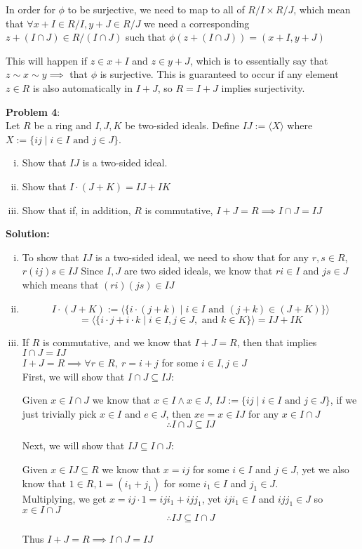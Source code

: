 \documentclass[11pt]{article}
\newcommand{\prob}[3]{\begin{flushleft}
        \textbf{Problem #1}: \\
        #2 
		\textbf{Solution:} 
		#3

\end{flushleft}}
\begin{document}
{    In order for $\phi$ to be surjective, we need to map to all of $R/I \times R/J$, which mean that $\forall x + I \in R/I, y + J \in R/J$ we need a corresponding $z + (I \cap J) \in R/(I \cap J)$ such that $\phi(z + (I \cap J)) = (x + I, y + J)$

    This will happen if $z \in x + I$ and $z \in y + J$, which is to essentially say that $z \sim x \sim y \implies$ that $\phi$ is surjective.
    This is guaranteed to occur if any element $z \in R$ is also automatically in $I + J$, so $R = I + J$ implies surjectivity.
}

\prob{4}{
    Let $R$ be a ring and $I,J,K$ be two-sided ideals. Define $IJ := \langle X \rangle$ where $X := \{ ij \mid i \in I \text{ and } j \in J \}$.
    \begin{enumerate}[(i)]
        \item Show that $IJ$ is a two-sided ideal.
        \item Show that $I \cdot (J + K) = IJ + IK$
        \item Show that if, in addition, $R$ is commutative, $I + J = R \implies I \cap J = IJ$
    \end{enumerate}
}{
    \begin{enumerate}[(i)]
        \item To show that $IJ$ is a two-sided ideal, we need to show that for any $r, s \in R$, $r(ij)s \in IJ$
              Since $I,J$ are two sided ideals, we know that $ri \in I$ and $js \in J$ which means that $(ri)(js) \in IJ$

        \item $$I \cdot (J + K) := \langle \{ i \cdot (j + k) \mid i \in I \text{ and } (j + k) \in (J + K) \} \rangle$$
              $$= \langle \{ i \cdot j + i \cdot k \mid i \in I, j \in J, \text{ and } k \in K \} \rangle = IJ + IK$$

        \item If $R$ is commutative, and we know that $I + J = R$, then that implies $I \cap J = IJ$ \\
              $I + J = R \implies \forall r \in R, \ r = i + j $ for some $i \in I, j \in J$ \\
              First, we will show that $I \cap J \subseteq IJ$:

              Given $x \in I \cap J$ we know that $x \in I \land x \in J$, $IJ := \{ ij \mid i \in I \text{ and } j \in J \}$, if we just trivially pick $x \in I$ and $e \in J$, then $xe = x \in IJ$ for any $x \in I \cap J$
              $$\therefore I \cap J \subseteq IJ$$

              Next, we will show that $IJ \subseteq I \cap J$:

              Given $x \in IJ \subseteq R$ we know that $x = ij$ for some $i \in I$ and $j \in J$, yet we also know that $1 \in R, 1 = (i_1 + j_1)$ for some $i_1 \in I$ and $j_1 \in J$. \\
              Multiplying, we get $x = ij \cdot 1 = iji_1 + ijj_1$, yet $iji_1 \in I$ and $ijj_1 \in J$ so $x \in I \cap J$
              $$\therefore IJ \subseteq I \cap J$$

              Thus $I + J = R \implies I \cap J = IJ$
    \end{enumerate}
}
\end{document}
